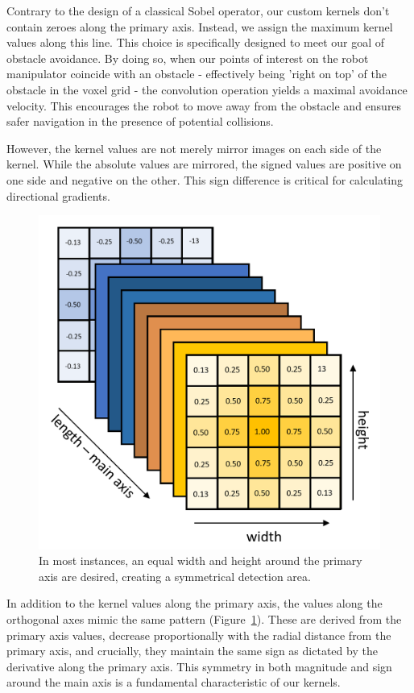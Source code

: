 \documentclass[a4paper]{article}
\begin{document}
Contrary to the design of a classical Sobel operator, our custom kernels don't contain zeroes along the primary axis. Instead, we assign the maximum kernel values along this line. This choice is specifically designed to meet our goal of obstacle avoidance. By doing so, when our points of interest on the robot manipulator coincide with an obstacle - effectively being 'right on top' of the obstacle in the voxel grid - the convolution operation yields a maximal avoidance velocity. This encourages the robot to move away from the obstacle and ensures safer navigation in the presence of potential collisions.

However, the kernel values are not merely mirror images on each side of the kernel. While the absolute values are mirrored, the signed values are positive on one side and negative on the other. This sign difference is critical for calculating directional gradients.

\begin{figure}[H]
	\centering
	\includegraphics[width=0.85\linewidth]{kernel-matrix.png}
	\caption{In most instances, an equal width and height around the primary axis are desired, creating a symmetrical detection area.} 
	\label{Kernel matrix}
\end{figure}

In addition to the kernel values along the primary axis, the values along the orthogonal axes mimic the same pattern (Figure~\ref{Kernel matrix}). These are derived from the primary axis values, decrease proportionally with the radial distance from the primary axis, and crucially, they maintain the same sign as dictated by the derivative along the primary axis. This symmetry in both magnitude and sign around the main axis is a fundamental characteristic of our kernels.
\end{document}
